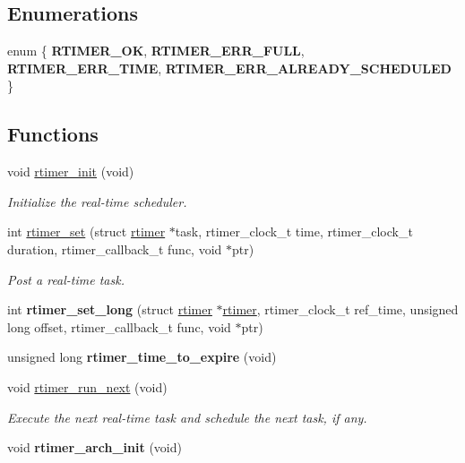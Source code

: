 \subsection*{Enumerations}
\begin{DoxyCompactItemize}
\item 
enum \{ {\bfseries R\-T\-I\-M\-E\-R\-\_\-\-O\-K}, 
{\bfseries R\-T\-I\-M\-E\-R\-\_\-\-E\-R\-R\-\_\-\-F\-U\-L\-L}, 
{\bfseries R\-T\-I\-M\-E\-R\-\_\-\-E\-R\-R\-\_\-\-T\-I\-M\-E}, 
{\bfseries R\-T\-I\-M\-E\-R\-\_\-\-E\-R\-R\-\_\-\-A\-L\-R\-E\-A\-D\-Y\-\_\-\-S\-C\-H\-E\-D\-U\-L\-E\-D}
 \}
\end{DoxyCompactItemize}
\subsection*{Functions}
\begin{DoxyCompactItemize}
\item 
void \hyperlink{group__rt_ga655b7809b449b92eb2579db5f5c10e78}{rtimer\-\_\-init} (void)
\begin{DoxyCompactList}\small\item\em Initialize the real-\/time scheduler. \end{DoxyCompactList}\item 
int \hyperlink{group__rt_ga6a437542171f242142c80b4c3d8e4bfa}{rtimer\-\_\-set} (struct \hyperlink{structrtimer}{rtimer} $\ast$task, rtimer\-\_\-clock\-\_\-t time, rtimer\-\_\-clock\-\_\-t duration, rtimer\-\_\-callback\-\_\-t func, void $\ast$ptr)
\begin{DoxyCompactList}\small\item\em Post a real-\/time task. \end{DoxyCompactList}\item 
\hypertarget{group__rt_ga3007f52b4104251bcc2491237c66de39}{int {\bfseries rtimer\-\_\-set\-\_\-long} (struct \hyperlink{structrtimer}{rtimer} $\ast$\hyperlink{structrtimer}{rtimer}, rtimer\-\_\-clock\-\_\-t ref\-\_\-time, unsigned long offset, rtimer\-\_\-callback\-\_\-t func, void $\ast$ptr)}\label{group__rt_ga3007f52b4104251bcc2491237c66de39}

\item 
\hypertarget{group__rt_ga4f90133fee9050ec6554eb766e4c96a5}{unsigned long {\bfseries rtimer\-\_\-time\-\_\-to\-\_\-expire} (void)}\label{group__rt_ga4f90133fee9050ec6554eb766e4c96a5}

\item 
void \hyperlink{group__rt_gaa9322a37b5a9b7ff51018fa67e39ad3b}{rtimer\-\_\-run\-\_\-next} (void)
\begin{DoxyCompactList}\small\item\em Execute the next real-\/time task and schedule the next task, if any. \end{DoxyCompactList}\item 
\hypertarget{group__rt_gaa52e494f9a26390231d998237b1b849a}{void {\bfseries rtimer\-\_\-arch\-\_\-init} (void)}\label{group__rt_gaa52e494f9a26390231d998237b1b849a}


\end{DoxyCompactItemize}
